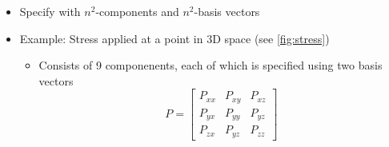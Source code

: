 \documentclass[a4paper]{article}
\begin{document}
    \begin{itemize}
        \item Specify with $n^2$-components and $n^2$-basis vectors
        \item Example: Stress applied at a point in 3D space (see \ref{fig:stress})
        \begin{itemize}
            \item Consists of 9 componenents, each of which is specified using two basis vectors 
            \begin{equation}
                P = \left[
                    \begin{array}{ccc}
                         P_{xx} & P_{xy} & P_{xz} \\
                         P_{yx} & P_{yy} & P_{yz} \\
                         P_{zx} & P_{yz} & P_{zz}
                    \end{array}
                    \right]
            \end{equation}
                \begin{figure}[h!]
    \centering
            

\end{figure}
\end{itemize}
\end{itemize}
\end{document}
